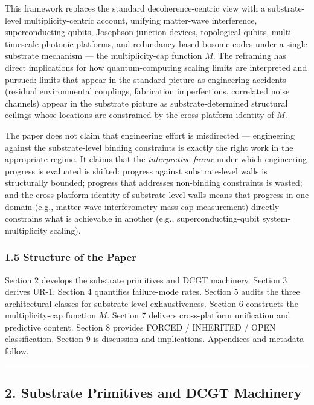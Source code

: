 \documentclass[
  11pt,
  a4paper,
]{article}
\begin{document}
This framework replaces the standard decoherence-centric view with a
substrate-level multiplicity-centric account, unifying matter-wave
interference, superconducting qubits, Josephson-junction devices,
topological qubits, multi-timescale photonic platforms, and
redundancy-based bosonic codes under a single substrate mechanism ---
the multiplicity-cap function \(M\). The reframing has direct
implications for how quantum-computing scaling limits are interpreted
and pursued: limits that appear in the standard picture as engineering
accidents (residual environmental couplings, fabrication imperfections,
correlated noise channels) appear in the substrate picture as
substrate-determined structural ceilings whose locations are constrained
by the cross-platform identity of \(M\).

The paper does not claim that engineering effort is misdirected ---
engineering against the substrate-level binding constraints is exactly
the right work in the appropriate regime. It claims that the
\emph{interpretive frame} under which engineering progress is evaluated
is shifted: progress against substrate-level walls is structurally
bounded; progress that addresses non-binding constraints is wasted; and
the cross-platform identity of substrate-level walls means that progress
in one domain (e.g., matter-wave-interferometry mass-cap measurement)
directly constrains what is achievable in another (e.g.,
superconducting-qubit system-multiplicity scaling).

\subsubsection{1.5 Structure of the Paper}\label{structure-of-the-paper}

Section 2 develops the substrate primitives and DCGT machinery. Section
3 derives UR-1. Section 4 quantifies failure-mode rates. Section 5
audits the three architectural classes for substrate-level
exhaustiveness. Section 6 constructs the multiplicity-cap function
\(M\). Section 7 delivers cross-platform unification and predictive
content. Section 8 provides FORCED / INHERITED / OPEN classification.
Section 9 is discussion and implications. Appendices and metadata
follow.

\begin{center}\rule{0.5\linewidth}{0.5pt}\end{center}

\subsection{2. Substrate Primitives and DCGT
Machinery}\label{substrate-primitives-and-dcgt-machinery}
\end{document}
